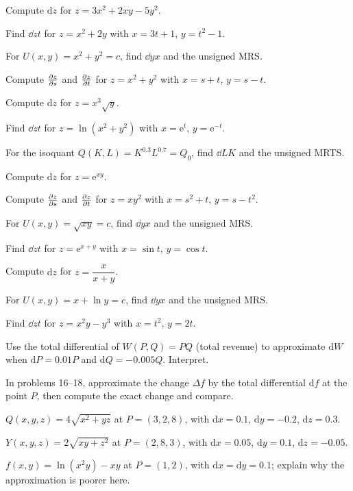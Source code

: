 \begin{problems}
  \item Compute $\mathrm{d}z$ for $z=3x^{2}+2xy-5y^{2}$.
  \item Find $\dd{z}{t}$ for $z=x^{2}+2y$ with $x=3t+1$, $y=t^{2}-1$.
  \item For $U(x,y)=x^{2}+y^{2}=c$, find $\dd{y}{x}$ and the unsigned MRS.
  \item Compute $\frac{\partial z}{\partial s}$ and $\frac{\partial z}{\partial t}$ for $z=x^{2}+y^{2}$ with
        $x=s+t$, $y=s-t$.
  \item Compute $\mathrm{d}z$ for $z=x^{3}\sqrt{y}$.
  \item Find $\dd{z}{t}$ for $z=\ln(x^{2}+y^{2})$ with $x=\mathrm{e}^{t}$,
        $y=\mathrm{e}^{-t}$.
  \item For the isoquant $Q(K,L)=K^{0.3}L^{0.7}=Q_{0}$, find $\dd{L}{K}$
        and the unsigned MRTS.
  \item Compute $\mathrm{d}z$ for $z=\mathrm{e}^{xy}$.
  \item Compute $\frac{\partial z}{\partial s}$ and $\frac{\partial z}{\partial t}$ for $z=xy^{2}$ with
        $x=s^{2}+t$, $y=s-t^{2}$.
  \item For $U(x,y)=\sqrt{xy}=c$, find $\dd{y}{x}$ and the unsigned MRS.
  \item Find $\dd{z}{t}$ for $z=\mathrm{e}^{x+y}$ with $x=\sin t$,
        $y=\cos t$.
  \item Compute $\mathrm{d}z$ for $z=\dfrac{x}{x+y}$.
  \item For $U(x,y)=x+\ln y=c$, find $\dd{y}{x}$ and the unsigned MRS.
  \item Find $\dd{z}{t}$ for $z=x^{2}y-y^{3}$ with $x=t^{2}$, $y=2t$.
  \item Use the total differential of $W(P,Q)=PQ$ (total revenue) to
        approximate $\mathrm{d}W$ when $\mathrm{d}P=0.01P$ and
        $\mathrm{d}Q=-0.005Q$. Interpret.
\end{problems}

In problems 16--18, approximate the change $\Delta f$ by the total
differential $\mathrm{d}f$ at the point $P$, then compute the exact change
and compare.

\begin{problems}[resume]
  \item $Q(x,y,z)=4\sqrt{x^{2}+yz}$ at $P=(3,2,8)$, with
        $\mathrm{d}x=0.1$, $\mathrm{d}y=-0.2$, $\mathrm{d}z=0.3$.
  \item $Y(x,y,z)=2\sqrt{xy+z^{2}}$ at $P=(2,8,3)$, with
        $\mathrm{d}x=0.05$, $\mathrm{d}y=0.1$, $\mathrm{d}z=-0.05$.
  \item $f(x,y)=\ln(x^{2}y)-xy$ at $P=(1,2)$, with
        $\mathrm{d}x=\mathrm{d}y=0.1$; explain why the approximation is
        poorer here.
\end{problems}

